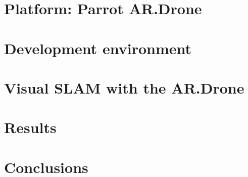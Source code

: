 \documentclass[twoside]{uva-bachelor-thesis}
\begin{document}
\chapter{Platform: Parrot AR.Drone}
\label{chapter:platform}




\chapter{Development environment}
\label{chapter:development-environment}




\chapter{Visual SLAM with the AR.Drone}
\label{chapter:visual-slam}




\chapter{Results}
\label{chapter:results}




%



\chapter{Conclusions}
\label{chapter:conclusions}




\begin{appendix}

\end{appendix}

\setcounter{chapter}{0}
\linespread{1.0}

%

\end{document}
